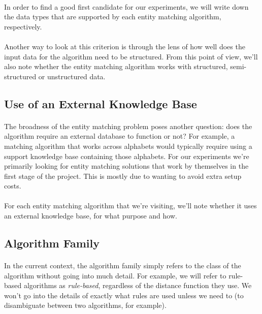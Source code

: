 \documentclass[a4paper,12pt]{article}
\begin{document}
\paragraph{}In order to find a good first candidate for our experiments, we will
write down the data types that are supported by each entity matching algorithm,
respectively.
\paragraph{}Another way to look at this criterion is through the lens of how
well does the input data for the algorithm need to be structured. From this
point of view, we'll also note whether the entity matching algorithm works with
structured, semi-structured or unstructured data.

\subsection{Use of an External Knowledge Base}
\paragraph{}The broadness of the entity matching problem poses another question:
does the algorithm require an external database to function or not? For example,
a matching algorithm that works across alphabets would typically require using
a support knowledge base containing those alphabets. For our experiments we're
primarily looking for entity matching solutions that work by themselves in the
first stage of the project. This is mostly due to wanting to avoid extra setup
costs.
\paragraph{}For each entity matching algorithm that we're visiting, we'll note
whether it uses an external knowledge base, for what purpose and how.

\subsection{Algorithm Family}

\paragraph{}In the current context, the algorithm family simply refers
to the class of the algorithm without going into much detail. For example,
we will refer to rule-based algorithms as \textit{rule-based}, regardless of the
distance function they use. We won't go into the details of exactly what rules
are used unless we need to (to disambiguate between two algorithms, for example).
\end{document}
